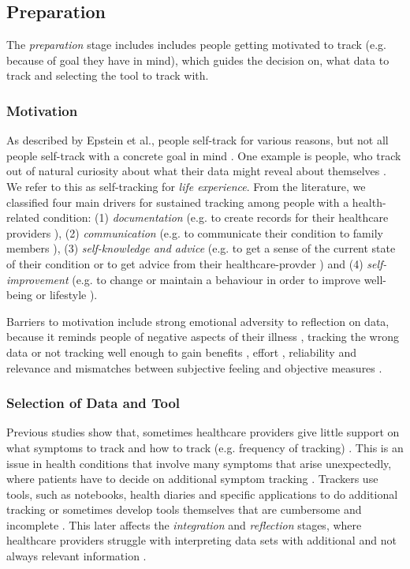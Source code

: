 \subsection{Preparation} 
The \textit{preparation} stage includes includes people getting motivated to track (e.g. because of goal they have in mind), which guides the decision on, what data to track and selecting the tool to track with. 

\subsubsection{Motivation} 
As described by Epstein et al., people self-track for various reasons, but not all people self-track with a concrete goal in mind \cite{Epstein2015}. One example is people, who track out of natural curiosity about what their data might reveal about themselves \cite{Li2010, Epstein2015}. We refer to this as self-tracking for \textit{life experience}. From the literature, we classified four main drivers for sustained tracking among people with a health-related condition: (1) \textit{documentation} (e.g. to create records for their healthcare providers \cite{Ancker2015}), (2) \textit{communication} (e.g. to communicate their condition to family members \cite{MacLeod2014}), (3) \textit{self-knowledge and advice} (e.g. to get a sense of the current state of their condition or to get advice from their healthcare-provder \cite{MacLeod2014, Ancker2015}) and (4) \textit{self-improvement} (e.g. to change or maintain a behaviour in order to improve well-being or lifestyle \cite{MacLeod2014, Ancker2015, Chung2016}).

Barriers to motivation include strong emotional adversity to reflection on data, because it reminds people of negative aspects of their illness \cite{Li2010, Ancker2015}, tracking the wrong data or not tracking well enough to gain benefits \cite{Chung2015}, effort \cite{Choe2014, Patel2012}, reliability and relevance \cite{Oh2015, piloting, Epstein2015} and mismatches between subjective feeling and objective measures \cite{Ancker2015}. 

\subsubsection{Selection of Data and Tool} 
Previous studies show that, sometimes healthcare providers give little support on what symptoms to track and how to track (e.g. frequency of tracking) \cite{Patel2012}. This is an issue in health conditions that involve many symptoms that arise unexpectedly, where patients have to decide on additional symptom tracking \cite{Patel2012, Chung2016}. Trackers use tools, such as notebooks, health diaries and specific applications to do additional tracking or sometimes develop tools themselves that are cumbersome and incomplete \cite{Patel2012}. This later affects the \textit{integration} and \textit{reflection} stages, where healthcare providers struggle with interpreting data sets with additional and not always relevant information \cite{Chung2015, Chung2016}.

